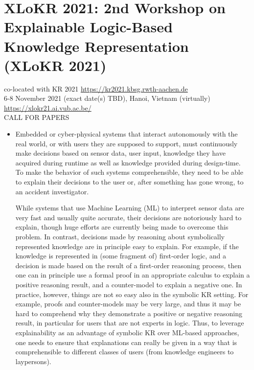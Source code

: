 \documentclass[prodmode,acmtecs]{acmsmall} %
\begin{document}
\section{XLoKR 2021: 2nd Workshop on Explainable Logic-Based Knowledge Representation (XLoKR 2021) }\label{XLoKR2021}  co-located with KR 2021 \href{https://kr2021.kbsg.rwth-aachen.de}{https://kr2021.kbsg.rwth-aachen.de}\\ 
  6-8 November 2021 (exact date(s) TBD), Hanoi, Vietnam (virtually) \\ 
  \href{https://xlokr21.ai.vub.ac.be/}{https://xlokr21.ai.vub.ac.be/} \\ 
CALL FOR PAPERS 

\begin{itemize}\item   Embedded or cyber-physical systems that interact autonomously with the real world, or with users they are supposed to support, must continuously make decisions based on sensor data, user input, knowledge they have acquired during runtime as well as knowledge provided during design-time. To make the behavior of such systems comprehensible, they need to be able to explain their decisions to the user or, after something has gone wrong, to an accident investigator. 
 
  While systems that use Machine Learning (ML) to interpret sensor data are very fast and usually quite accurate, their decisions are notoriously hard to explain, though huge efforts are currently being made to overcome this problem. In contrast, decisions made by reasoning about symbolically represented knowledge are in principle easy to explain. For example, if the knowledge is represented in (some fragment of) first-order logic, and a decision is made based on the result of a first-order reasoning process, then one can in principle use a formal proof in an appropriate calculus to explain a positive reasoning result, and a counter-model to explain a negative one. In practice, however, things are not so easy also in the symbolic KR setting. For example, proofs and counter-models may be very large, and thus it may be hard to comprehend why they demonstrate a positive or negative reasoning result, in particular for users that are not experts in logic. Thus, to leverage explainability as an advantage of symbolic KR over ML-based approaches, one needs to ensure that explanations can really be given in a way that is comprehensible to different classes of users (from knowledge engineers to laypersons).  
 

\end{itemize}
\end{document}
